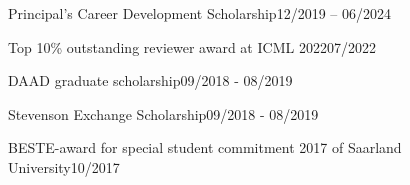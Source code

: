 \documentclass[]{lukas-cv-openfont}
\begin{document}


\noindent
\begin{tightitemize}{1.0em}
    \item Principal's Career Development Scholarship\hfill 12/2019 -- 06/2024
    \item Top 10\% outstanding reviewer award at ICML 2022\hfill 07/2022
    \item DAAD graduate scholarship\hfill 09/2018 - 08/2019
    \item Stevenson Exchange Scholarship\hfill 09/2018 - 08/2019
    \item BESTE-award for special student commitment 2017 of Saarland University\hfill 10/2017
\end{tightitemize}
\sectionsep


\end{document}
